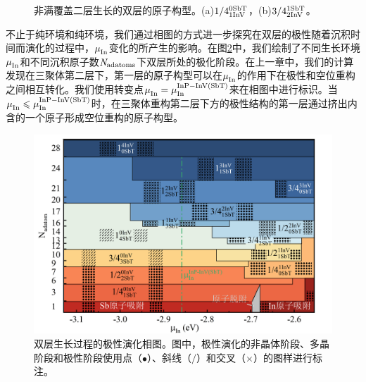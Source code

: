 \begin{figure}[htb]
{        \label{fig:IS_structure_partical_3-4_1-2}
    }
    \caption{非满覆盖二层生长的双层的原子构型。(a)$\rm 1/4{}_{1InV}^{0SbT} \it$，(b)$\rm 3/4{}_{2InV}^{1SbT} \it$。}
    \label{fig:IS_structure_partical_2}
\end{figure}

不止于纯环境和纯环境，我们通过相图的方式进一步探究在双层的极性随着沉积时间而演化的过程中，$\it \mu_{\rm In}^{\rm } \it$变化的所产生的影响。在图\ref{fig:IS_DFT_2LInSb_partPhase}中，我们绘制了不同生长环境$\it \mu_{\rm In}^{\rm } \it$和不同沉积原子数$\it N_{\rm adatoms} \it$下双层所处的极化阶段。在上一章中，我们的计算发现在三聚体第二层下，第一层的原子构型可以在$\it \mu_{\rm In}^{\rm } \it$的作用下在极性和空位重构之间相互转化。我们使用转变点$\it \mu_{\rm In}^{\rm } \it=\it \mu_{\rm In}^{\rm InP-InV\left(SbT\right)} \it$来在相图中进行标识。当$\it \mu_{\rm In}^{\rm } \it \leqslant \it \mu_{\rm In}^{\rm InP-InV\left(SbT\right)} \it$时，在三聚体重构第二层下方的极性结构的第一层通过挤出内含的一个原子形成空位重构的原子构型。

\begin{figure}[htb]
    \includegraphics{pic/IS_DFT_2LInSb_partPhase.png}
    \caption{双层生长过程的极性演化相图。图中，极性演化的非晶体阶段、多晶阶段和极性阶段使用点（$\bullet$）、斜线（$/ $）和交叉（$\times$）的图样进行标注。}
    \label{fig:IS_DFT_2LInSb_partPhase}
\end{figure}

